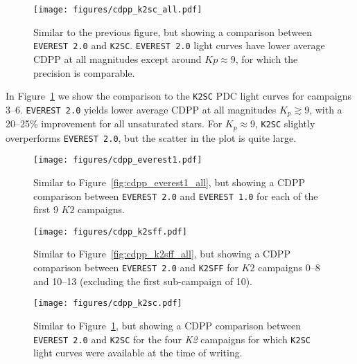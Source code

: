 \documentclass[]{aastex62}
\newcommand{\Kp}{\ensuremath{Kp}}
\newcommand{\edited}[1]{{\color{red} #1}}
\begin{document}
\begin{figure}[hbt]
  \begin{center}
      \texttt{[image: figures/cdpp\_k2sc\_all.pdf]}
       \caption{Similar to the previous figure, but showing a comparison between \texttt{EVEREST 2.0} and \texttt{K2SC}.
       \texttt{EVEREST 2.0} light curves have lower average CDPP at all magnitudes except around $\Kp \approx 9$, for which
       the precision is comparable.}
     \label{fig:cdpp_k2sc_all}
  \end{center}
\end{figure}

In Figure~\ref{fig:cdpp_k2sc_all} we show the comparison to the \texttt{K2SC} PDC
light curves \citep{Aigrain15,Aigrain16} \edited{for campaigns 3--6}. \texttt{EVEREST 2.0} yields lower average CDPP at all
magnitudes $K_p \gtrsim 9$, with a 20--25\% improvement for
all unsaturated stars. For $K_p \approx 9$, \texttt{K2SC} slightly overperforms
\texttt{EVEREST 2.0}, but the scatter in the plot is quite large.

\begin{figure}[hbt]
  \begin{center}
      \texttt{[image: figures/cdpp\_everest1.pdf]}
       \caption{Similar to Figure~\ref{fig:cdpp_everest1_all}, but showing a CDPP comparison between
       \texttt{EVEREST 2.0} and \texttt{EVEREST 1.0} for each of the first 9 $K2$ campaigns.}
     \label{fig:cdpp_everest1}
  \end{center}
\end{figure}

\begin{figure}[hbt]
  \begin{center}
      \texttt{[image: figures/cdpp\_k2sff.pdf]}
       \caption{\edited{Similar to Figure~\ref{fig:cdpp_k2sff_all}, but showing a CDPP comparison between
       \texttt{EVEREST 2.0} and \texttt{K2SFF} for $K2$ campaigns 0--8 and 10--13 (excluding the first sub-campaign
       of 10).}}
     \label{fig:cdpp_k2sff}
  \end{center}
\end{figure}

\begin{figure}[hbt]
  \begin{center}
      \texttt{[image: figures/cdpp\_k2sc.pdf]}
       \caption{Similar to Figure~\ref{fig:cdpp_k2sc_all}, but showing a CDPP comparison between
       \texttt{EVEREST 2.0} and \texttt{K2SC} for \edited{the four \emph{K2} campaigns for which
       \texttt{K2SC} light curves were available at the time of writing.}}
     \label{fig:cdpp_k2sc}
  \end{center}
\end{figure}
\end{document}
